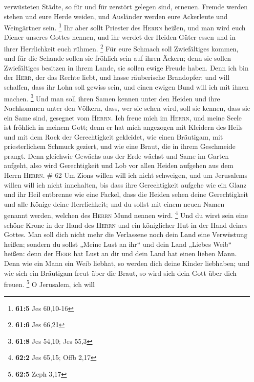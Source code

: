 verwüsteten Städte, so für und für zerstört gelegen sind, erneuen.
 Fremde werden stehen und eure Herde weiden, und Ausländer
werden eure Ackerleute und Weingärtner sein. \footnote{\textbf{61:5} Jes
  60,10-16}  Ihr aber sollt Priester des \textsc{Herrn}
heißen, und man wird euch Diener unseres Gottes nennen, und ihr werdet
der Heiden Güter essen und in ihrer Herrlichkeit euch rühmen.
\footnote{\textbf{61:6} Jes 66,21}  Für eure Schmach soll
Zwiefältiges kommen, und für die Schande sollen sie fröhlich sein auf
ihren Äckern; denn sie sollen Zwiefältiges besitzen in ihrem Lande, sie
sollen ewige Freude haben.  Denn ich bin der
\textsc{Herr}, der das Rechte liebt, und hasse räuberische Brandopfer;
und will schaffen, dass ihr Lohn soll gewiss sein, und einen ewigen Bund
will ich mit ihnen machen. \footnote{\textbf{61:8} Jes 54,10; Jes 55,3}
 Und man soll ihren Samen kennen unter den Heiden und ihre
Nachkommen unter den Völkern, dass, wer sie sehen wird, soll sie kennen,
dass sie ein Same sind, gesegnet vom \textsc{Herrn}.  Ich
freue mich im \textsc{Herrn}, und meine Seele ist fröhlich in meinem
Gott; denn er hat mich angezogen mit Kleidern des Heils und mit dem Rock
der Gerechtigkeit gekleidet, wie einen Bräutigam, mit priesterlichem
Schmuck geziert, und wie eine Braut, die in ihrem Geschmeide prangt.
 Denn gleichwie Gewächs aus der Erde wächst und Same im
Garten aufgeht, also wird Gerechtigkeit und Lob vor allen Heiden
aufgehen aus dem Herrn \textsc{Herrn}. \# 62  Um Zions
willen will ich nicht schweigen, und um Jerusalems willen will ich nicht
innehalten, bis dass ihre Gerechtigkeit aufgehe wie ein Glanz und ihr
Heil entbrenne wie eine Fackel,  dass die Heiden sehen
deine Gerechtigkeit und alle Könige deine Herrlichkeit; und du sollst
mit einem neuen Namen genannt werden, welchen des \textsc{Herrn} Mund
nennen wird. \footnote{\textbf{62:2} Jes 65,15; Offb 2,17}
 Und du wirst sein eine schöne Krone in der Hand des
\textsc{Herrn} und ein königlicher Hut in der Hand deines Gottes.
 Man soll dich nicht mehr die Verlassene noch dein Land
eine Verwüstung heißen; sondern du sollst „Meine Lust an ihr`` und dein
Land „Liebes Weib`` heißen: denn der \textsc{Herr} hat Lust an dir und
dein Land hat einen lieben Mann.  Denn wie ein Mann ein
Weib liebhat, so werden dich deine Kinder liebhaben; und wie sich ein
Bräutigam freut über die Braut, so wird sich dein Gott über dich freuen.
\footnote{\textbf{62:5} Zeph 3,17}  O Jerusalem, ich will

